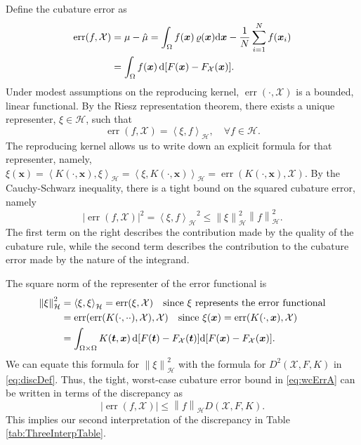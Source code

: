 \documentclass[graybox]{svmult}
\newcommand{\vx}{\boldsymbol{x}}
\newcommand{\vt}{\boldsymbol{t}}
\newcommand{\dif}{{\rm d}}
\newcommand{\Xdes}{\mathcal{X}}
\newcommand{\ch}{\mathcal{H}}
\newcommand{\ip}[3][{}]{\ensuremath{\left \langle #2, #3 \right \rangle_{#1}}}
\newcommand{\norm}[2][{}]{\ensuremath{\left \lVert #2 \right \rVert}_{#1}}
\DeclareMathOperator{\err}{err}
\def\abs#1{\ensuremath{\left \lvert #1 \right \rvert}}
\begin{document}
Define the cubature error as  
\begin{align}
\nonumber 
\err(f,\Xdes) & = \mu - \hat{\mu} = \int_{\Omega} f(\vx)\, \varrho(\vx) \dif \vx -\frac{1}{N}\sum_{i=1}^N f(\vx_i) \\
& =\int_\Omega f(\vx) \, \dif[F(\vx)-F_{\Xdes}(\vx)]. \label{eq:err}
\end{align}
Under modest assumptions on the reproducing kernel,  $\err(\cdot, \Xdes)$ is a bounded, linear functional. 
By the Riesz representation theorem, there exists a unique representer, $\xi \in \ch$, such that 
\[
\err(f, \Xdes)=\ip[\ch]{\xi}{f}, \quad \forall f\in \ch.
\]
The reproducing kernel allows us to write down an explicit formula for that representer, namely, $\xi(\vx)=\ip[\ch]{K(\cdot,\vx)}{\xi}=\ip[\ch]{\xi}{K(\cdot,\vx)}=\err(K(\cdot,\vx),\Xdes)$.
By the Cauchy-Schwarz inequality, there is a tight bound on the squared cubature error, namely
\begin{equation}\label{eq:wcErrA}
\abs{\err(f,\Xdes)}^2=\ip[\ch]{\xi}{f}^2\leq \norm[\ch]{\xi}^2 \norm[\ch]{f}^2 .
\end{equation}
The first term on the right describes the contribution made by the quality of the cubature rule, while the second term describes the contribution to the cubature error made by the nature of the integrand.

The square norm of the representer of the error functional is 
\begin{align*}
\norm[\ch]{\xi}^2& =\ip[\ch]{\xi}{\xi}=\err(\xi,\Xdes) \quad \text{since $\xi$ represents the error functional}\\
& = \err(\err(K(\cdot,\cdot \cdot),\Xdes),\Xdes) \quad \text{since } \xi(\vx)=\err(K(\cdot,\vx),\Xdes)\\
& =\int_{\Omega\times \Omega} K(\vt,\vx)\, \dif[F(\vt)-F_{\Xdes}(\vt)] \dif[F(\vx)-F_{\Xdes}(\vx)] .
\end{align*}
We can equate this formula for $\norm[\ch]{\xi}^2$ with the formula for $D^2(\Xdes,F,K)$ in  \eqref{eq:discDef}.  Thus, the tight, worst-case cubature error  bound in \eqref{eq:wcErrA} can be written in terms of the discrepancy as
\begin{equation*}\label{eq:wcErrB}
\abs{\err(f,\Xdes)} \le \norm[\ch]{f} D(\Xdes,F,K).
\end{equation*}
This implies our second interpretation of the discrepancy in Table \ref{tab:ThreeInterpTable}.
\end{document}
